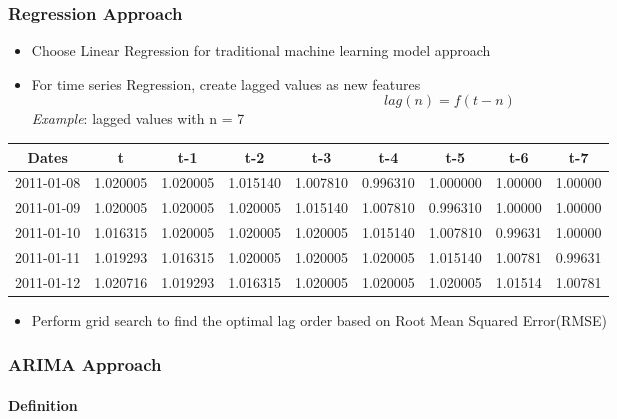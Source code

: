 \documentclass[11pt]{article}
\providecommand{\tightlist}{%
      \setlength{\itemsep}{0pt}\setlength{\parskip}{0pt}}
\begin{document}
\subsubsection{Regression Approach}\label{regression-approach}

\begin{itemize}
\tightlist
\item
  Choose Linear Regression for traditional machine learning model
  approach
\item
  For time series Regression, create lagged values as new features
  \[lag(n) = f(t-n) \] \emph{Example}: lagged values with n = 7
\end{itemize}

\begin{longtable}[]{@{}ccccccccc@{}}
\toprule
\textbf{Dates} & \textbf{t} & \textbf{t-1} & \textbf{t-2} & \textbf{t-3}
& \textbf{t-4} & \textbf{t-5} & \textbf{t-6} &
\textbf{t-7}\tabularnewline
\midrule
\endhead
2011-01-08 & 1.020005 & 1.020005 & 1.015140 & 1.007810 & 0.996310 &
1.000000 & 1.00000 & 1.00000\tabularnewline
2011-01-09 & 1.020005 & 1.020005 & 1.020005 & 1.015140 & 1.007810 &
0.996310 & 1.00000 & 1.00000\tabularnewline
2011-01-10 & 1.016315 & 1.020005 & 1.020005 & 1.020005 & 1.015140 &
1.007810 & 0.99631 & 1.00000\tabularnewline
2011-01-11 & 1.019293 & 1.016315 & 1.020005 & 1.020005 & 1.020005 &
1.015140 & 1.00781 & 0.99631\tabularnewline
2011-01-12 & 1.020716 & 1.019293 & 1.016315 & 1.020005 & 1.020005 &
1.020005 & 1.01514 & 1.00781\tabularnewline
\bottomrule
\end{longtable}

\begin{itemize}
\tightlist
\item
  Perform grid search to find the optimal lag order based on Root Mean
  Squared Error(RMSE)
\end{itemize}

\subsubsection{ARIMA Approach}\label{arima-approach}

\paragraph{Definition}\label{definition-1}
\end{document}
